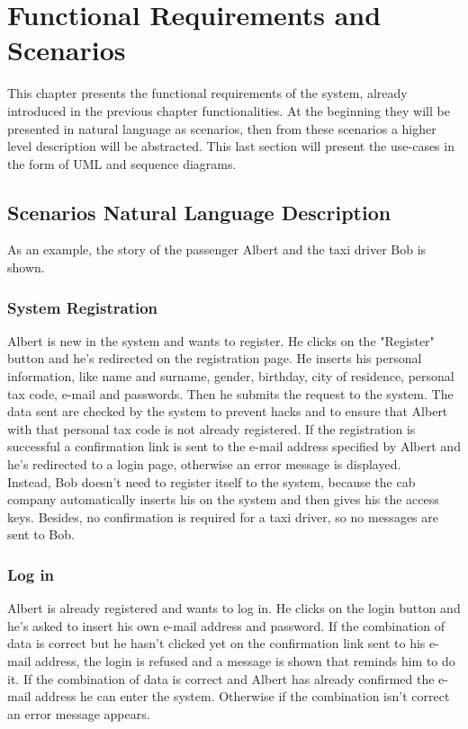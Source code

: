 \chapter{Functional Requirements and Scenarios}

\setmyfancystyle

\label{reqs}
This chapter presents the functional requirements of the system, already introduced in the previous chapter functionalities. At the beginning they will be presented in natural language as scenarios, then from these scenarios a higher level description will be abstracted. This last section will present the use-cases in the form of UML and sequence diagrams.

\section{Scenarios Natural Language Description}
As an example, the story of the passenger Albert and the taxi driver Bob is shown.

\subsection{System Registration}
Albert is new in the system and wants to register. He clicks on the "Register" button and he's redirected on the registration page. He inserts his personal information, like name and surname, gender, birthday, city of residence, personal tax code, e-mail and passwords. Then he submits the request to the system. The data sent are checked by the system to prevent hacks and to ensure that Albert with that personal tax code is not already registered. If the registration is successful a confirmation link is sent to the e-mail address specified by Albert and he's redirected to a login page, otherwise an error message is displayed.\\
Instead, Bob doesn't need to register itself to the system, because the cab company automatically inserts his on the system and then gives his the access keys. Besides, no confirmation is required for a taxi driver, so no messages are sent to Bob.

\subsection{Log in}
Albert is already registered and wants to log in. He clicks on the login button and he's asked to insert his own e-mail address and password. If the combination of data is correct but he hasn't clicked yet on the confirmation link sent to his e-mail address, the login is refused and a message is shown that reminds him to do it. If the combination of data is correct and Albert has already confirmed the e-mail address he can enter the system. Otherwise if the combination isn't correct an error message appears.

